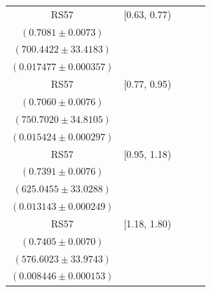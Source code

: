 {\begin{longtable}{|c|c|c|c|c|}
RS57 & [0.63, 0.77) & \begin{tabular}{@{}c@{}}$0.7267 \pm 0.0057$ \\ $(0.7081 \pm 0.0073)$\end{tabular} & \begin{tabular}{@{}c@{}}$682.5356 \pm 32.5640$ \\ $(700.4422 \pm 33.4183)$\end{tabular} & \begin{tabular}{@{}c@{}}$0.015873 \pm 0.000454$ \\ $(0.017477 \pm 0.000357)$\end{tabular} \\ \hline
RS57 & [0.77, 0.95) & \begin{tabular}{@{}c@{}}$0.7214 \pm 0.0056$ \\ $(0.7060 \pm 0.0076)$\end{tabular} & \begin{tabular}{@{}c@{}}$734.6896 \pm 34.0680$ \\ $(750.7020 \pm 34.8105)$\end{tabular} & \begin{tabular}{@{}c@{}}$0.014461 \pm 0.000381$ \\ $(0.015424 \pm 0.000297)$\end{tabular} \\ \hline
RS57 & [0.95, 1.18) & \begin{tabular}{@{}c@{}}$0.7159 \pm 0.0062$ \\ $(0.7391 \pm 0.0076)$\end{tabular} & \begin{tabular}{@{}c@{}}$645.3170 \pm 34.1000$ \\ $(625.0455 \pm 33.0288)$\end{tabular} & \begin{tabular}{@{}c@{}}$0.012216 \pm 0.000323$ \\ $(0.013143 \pm 0.000249)$\end{tabular} \\ \hline
RS57 & [1.18, 1.80) & \begin{tabular}{@{}c@{}}$0.6945 \pm 0.0071$ \\ $(0.7405 \pm 0.0070)$\end{tabular} & \begin{tabular}{@{}c@{}}$614.8302 \pm 36.2267$ \\ $(576.6023 \pm 33.9743)$\end{tabular} & \begin{tabular}{@{}c@{}}$0.008176 \pm 0.000199$ \\ $(0.008446 \pm 0.000153)$\end{tabular} \\ \hline

\end{longtable}}

